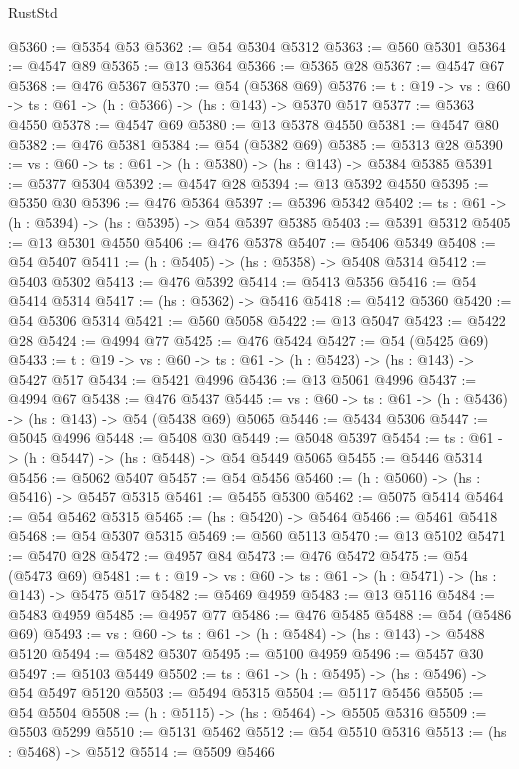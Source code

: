 \begin{lexlean}{RustStd}
\begin{coremodule}
@5360 := @5354 @53
@5362 := @54 @5304 @5312
@5363 := @560 @5301
@5364 := @4547 @89
@5365 := @13 @5364
@5366 := @5365 @28
@5367 := @4547 @67
@5368 := @476 @5367
@5370 := @54 (@5368 @69)
@5376 := {t : @19} -> {vs : @60} -> {ts : @61} -> (h : @5366) -> (hs : @143) -> @5370 @517
@5377 := @5363 @4550
@5378 := @4547 @69
@5380 := @13 @5378 @4550
@5381 := @4547 @80
@5382 := @476 @5381
@5384 := @54 (@5382 @69)
@5385 := @5313 @28
@5390 := {vs : @60} -> {ts : @61} -> (h : @5380) -> (hs : @143) -> @5384 @5385
@5391 := @5377 @5304
@5392 := @4547 @28
@5394 := @13 @5392 @4550
@5395 := @5350 @30
@5396 := @476 @5364
@5397 := @5396 @5342
@5402 := {ts : @61} -> (h : @5394) -> (hs : @5395) -> @54 @5397 @5385
@5403 := @5391 @5312
@5405 := @13 @5301 @4550
@5406 := @476 @5378
@5407 := @5406 @5349
@5408 := @54 @5407
@5411 := (h : @5405) -> (hs : @5358) -> @5408 @5314
@5412 := @5403 @5302
@5413 := @476 @5392
@5414 := @5413 @5356
@5416 := @54 @5414 @5314
@5417 := (hs : @5362) -> @5416
@5418 := @5412 @5360
@5420 := @54 @5306 @5314
@5421 := @560 @5058
@5422 := @13 @5047
@5423 := @5422 @28
@5424 := @4994 @77
@5425 := @476 @5424
@5427 := @54 (@5425 @69)
@5433 := {t : @19} -> {vs : @60} -> {ts : @61} -> (h : @5423) -> (hs : @143) -> @5427 @517
@5434 := @5421 @4996
@5436 := @13 @5061 @4996
@5437 := @4994 @67
@5438 := @476 @5437
@5445 := {vs : @60} -> {ts : @61} -> (h : @5436) -> (hs : @143) -> @54 (@5438 @69) @5065
@5446 := @5434 @5306
@5447 := @5045 @4996
@5448 := @5408 @30
@5449 := @5048 @5397
@5454 := {ts : @61} -> (h : @5447) -> (hs : @5448) -> @54 @5449 @5065
@5455 := @5446 @5314
@5456 := @5062 @5407
@5457 := @54 @5456
@5460 := (h : @5060) -> (hs : @5416) -> @5457 @5315
@5461 := @5455 @5300
@5462 := @5075 @5414
@5464 := @54 @5462 @5315
@5465 := (hs : @5420) -> @5464
@5466 := @5461 @5418
@5468 := @54 @5307 @5315
@5469 := @560 @5113
@5470 := @13 @5102
@5471 := @5470 @28
@5472 := @4957 @84
@5473 := @476 @5472
@5475 := @54 (@5473 @69)
@5481 := {t : @19} -> {vs : @60} -> {ts : @61} -> (h : @5471) -> (hs : @143) -> @5475 @517
@5482 := @5469 @4959
@5483 := @13 @5116
@5484 := @5483 @4959
@5485 := @4957 @77
@5486 := @476 @5485
@5488 := @54 (@5486 @69)
@5493 := {vs : @60} -> {ts : @61} -> (h : @5484) -> (hs : @143) -> @5488 @5120
@5494 := @5482 @5307
@5495 := @5100 @4959
@5496 := @5457 @30
@5497 := @5103 @5449
@5502 := {ts : @61} -> (h : @5495) -> (hs : @5496) -> @54 @5497 @5120
@5503 := @5494 @5315
@5504 := @5117 @5456
@5505 := @54 @5504
@5508 := (h : @5115) -> (hs : @5464) -> @5505 @5316
@5509 := @5503 @5299
@5510 := @5131 @5462
@5512 := @54 @5510 @5316
@5513 := (hs : @5468) -> @5512
@5514 := @5509 @5466

\end{coremodule}
\end{lexlean}
